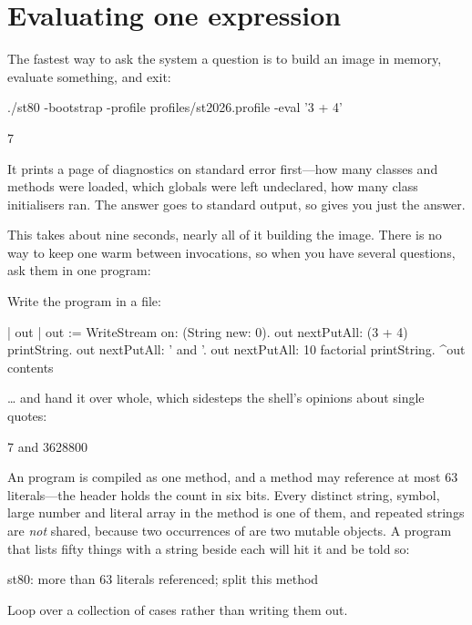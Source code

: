 \section{Evaluating one expression}

The fastest way to ask the system a question is to build an image in memory,
evaluate something, and exit:

\begin{sh}
./st80 -bootstrap -profile profiles/st2026.profile -eval '3 + 4'
\end{sh}

\begin{plain}
7
\end{plain}

It prints a page of diagnostics on standard error first---how many classes and
methods were loaded, which globals were left undeclared, how many class
initialisers ran. The answer goes to standard output, so 
gives you just the answer.

This takes about nine seconds, nearly all of it building the image. There is
no way to keep one warm between invocations, so when you have several
questions, ask them in one program:

Write the program in a file:

\begin{st}
| out |
out := WriteStream on: (String new: 0).
out nextPutAll: (3 + 4) printString.
out nextPutAll: ' and '.
out nextPutAll: 10 factorial printString.
^out contents
\end{st}

\ldots{} and hand it over whole, which sidesteps the shell's opinions about
single quotes:


\begin{plain}
7 and 3628800
\end{plain}

\begin{stnote}
An  program is compiled as one method, and a method may reference
at most 63 literals---the header holds the count in six bits. Every distinct
string, symbol, large number and literal array in the method is one of them,
and repeated strings are \emph{not} shared, because two occurrences of
 are two mutable objects. A program that lists fifty things with a
string beside each will hit it and be told so:

\begin{plain}
st80: more than 63 literals referenced; split this method
\end{plain}

Loop over a collection of cases rather than writing them out.
\end{stnote}

